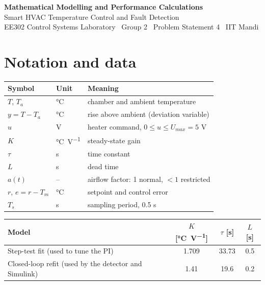 \documentclass[11pt,a4paper]{article}
\begin{document}
\begin{center}
{\LARGE\bfseries\color{accent} Mathematical Modelling and Performance Calculations}\\[6pt]
{\large Smart HVAC Temperature Control and Fault Detection}\\[3pt]
{\small EE302 Control Systems Laboratory \textbullet\ Group 2 \textbullet\ Problem Statement 4 \textbullet\ IIT Mandi}
\end{center}

\tableofcontents
\vspace{4mm}

\section{Notation and data}

\begin{center}
\begin{tabular}{@{}llp{}@{}}
\toprule
Symbol & Unit & Meaning\\
\midrule
$T$, $T_a$ & \si{\celsius} & chamber and ambient temperature\\
$y = T - T_a$ & \si{\celsius} & rise above ambient (deviation variable)\\
$u$ & V & heater command, $0 \le u \le U_{max} = 5$ V\\
$K$ & \si{\celsius\per\volt} & steady-state gain\\
$\tau$ & s & time constant\\
$L$ & s & dead time\\
$a(t)$ & -- & airflow factor: 1 normal, $<1$ restricted\\
$r$, $e = r - T_m$ & \si{\celsius} & setpoint and control error\\
$T_s$ & s & sampling period, 0.5 s\\
\bottomrule
\end{tabular}
\end{center}

\begin{center}
\begin{tabular}{@{}lccc@{}}
\toprule
Model & $K$ [\si{\celsius\per\volt}] & $\tau$ [s] & $L$ [s]\\
\midrule
Step-test fit (used to tune the PI) & 1.709 & 33.73 & 0.5\\
Closed-loop refit (used by the detector and Simulink) & 1.41 & 19.6 & 0.2\\
\bottomrule
\end{tabular}
\end{center}
\end{document}
